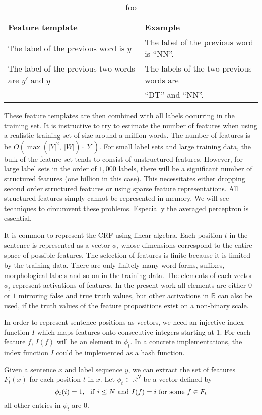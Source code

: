 \begin{table}[!htb]
\begin{tabular}{ll}
Feature template & Example\\
\hline
The label of the previous word is $y$ & The label of the previous word is ``NN''. \\
The label of the previous two words are $y'$ and $y$ & The labels of the two previous words are\\
 & ``DT'' and ``NN''. 
\end{tabular}
\caption{foo}\label{tab:sratna}
\end{table}

These feature templates are then combined with all labels occurring in
the training set. It is instructive to try to estimate the number of
features when using a realistic training set of size around a million
words. The number of features is be $O(\max(|Y|^2,\ |W|)\cdot
|Y|)$. For small label sets and large training data, the bulk of the
feature set tends to consist of unstructured features. However, for
large label sets in the order of $1,000$ labels, there will be a
significant number of structured features (one billion in this
case). This necessitates either dropping second order structured
features or using sparse feature representations. All structured
features simply cannot be represented in memory. We will see
techniques to circumvent these problems. Especially the averaged
perceptron is essential.

It is common to represent the CRF using linear algebra. Each position
$t$ in the sentence is represented as a vector $\phi_t$ whose
dimensions correspond to the entire space of possible features. The
selection of features is finite because it is limited by the training
data. There are only finitely many word forms, suffixes, morphological
labels and so on in the training data. The elements of each vector
$\phi_t$ represent activations of features. In the present work all
elements are either $0$ or $1$ mirroring false and true truth values,
but other activations in $\mathbb{R}$ can also be used, if the truth
values of the feature propositions exist on a non-binary scale.

In order to represent sentence positions as vectors, we need an
injective index function $I$ which maps features onto consecutive
integers starting at 1. For each feature $f$, $I(f)$ will be an
element in $\phi_t$. In a concrete implementations, the index function
$I$ could be implemented as a hash function.
 
Given a sentence $x$ and label sequence $y$, we can extract the set of features
$F_t(x)$ for each position $t$ in $x$. Let $\phi_t \in \mathbb{R}^N$ be a vector defined by
$$\phi_t(i) = 1,\ {\rm\ if}\ i \le N\ {\rm and}\ I(f) = i\ {\rm for\ some\ }f\in F_t$$
all other entries in $\phi_t$ are $0$. 

